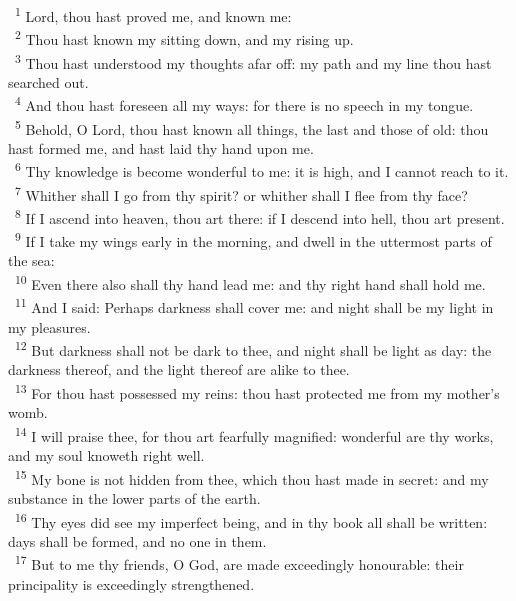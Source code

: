 \documentclass[a5paper,12pt]{article}
\begin{document}
\begin{multicols*}{2}
~\textsuperscript{1} Lord, thou hast proved me, and known me:\\
~\textsuperscript{2} Thou hast known my sitting down, and my rising up.\\
~\textsuperscript{3} Thou hast understood my thoughts afar off: my path and my line thou hast searched out.\\
~\textsuperscript{4} And thou hast foreseen all my ways: for there is no speech in my tongue.\\
~\textsuperscript{5} Behold, O Lord, thou hast known all things, the last and those of old: thou hast formed me, and hast laid thy hand upon me.\\
~\textsuperscript{6} Thy knowledge is become wonderful to me: it is high, and I cannot reach to it.\\
~\textsuperscript{7} Whither shall I go from thy spirit? or whither shall I flee from thy face?\\
~\textsuperscript{8} If I ascend into heaven, thou art there: if I descend into hell, thou art present.\\
~\textsuperscript{9} If I take my wings early in the morning, and dwell in the uttermost parts of the sea:\\
~\textsuperscript{10} Even there also shall thy hand lead me: and thy right hand shall hold me.\\
~\textsuperscript{11} And I said: Perhaps darkness shall cover me: and night shall be my light in my pleasures.\\
~\textsuperscript{12} But darkness shall not be dark to thee, and night shall be light as day: the darkness thereof, and the light thereof are alike to thee.\\
~\textsuperscript{13} For thou hast possessed my reins: thou hast protected me from my mother's womb.\\
~\textsuperscript{14} I will praise thee, for thou art fearfully magnified: wonderful are thy works, and my soul knoweth right well.\\
~\textsuperscript{15} My bone is not hidden from thee, which thou hast made in secret: and my substance in the lower parts of the earth.\\
~\textsuperscript{16} Thy eyes did see my imperfect being, and in thy book all shall be written: days shall be formed, and no one in them.\\
~\textsuperscript{17} But to me thy friends, O God, are made exceedingly honourable: their principality is exceedingly strengthened.\\

\end{multicols*}
\end{document}
